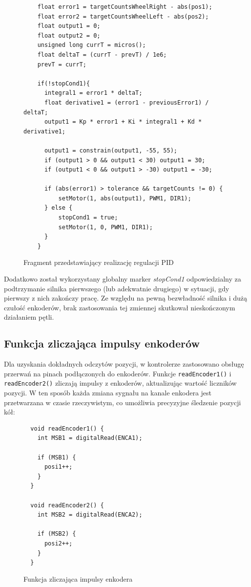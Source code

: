 \begin{figure}[H]
  \centering
  \begin{lstlisting}
    float error1 = targetCountsWheelRight - abs(pos1);
    float error2 = targetCountsWheelLeft - abs(pos2);
    float output1 = 0;
    float output2 = 0;
    unsigned long currT = micros();
    float deltaT = (currT - prevT) / 1e6;
    prevT = currT;

    if(!stopCond1){
      integral1 = error1 * deltaT;
      float derivative1 = (error1 - previousError1) / deltaT;
      output1 = Kp * error1 + Ki * integral1 + Kd * derivative1;

      output1 = constrain(output1, -55, 55);
      if (output1 > 0 && output1 < 30) output1 = 30;
      if (output1 < 0 && output1 > -30) output1 = -30;

      if (abs(error1) > tolerance && targetCounts != 0) {
          setMotor(1, abs(output1), PWM1, DIR1);
      } else {
          stopCond1 = true;
          setMotor(1, 0, PWM1, DIR1);
      }
    }
  \end{lstlisting}
  \caption{Fragment przedstawiający realizację regulacji PID}
  \label{fig:pseudokod:pid}
\end{figure}

Dodatkowo został wykorzystany globalny marker \textit{stopCond1} odpowiedzialny za podtrzymanie silnika pierwszego (lub adekwatnie drugiego) w sytuacji, gdy pierwszy z nich zakończy pracę. Ze względu na pewną bezwładność silnika i dużą czułość enkoderów, brak zastosowania tej zmiennej skutkował nieskończonym działaniem pętli. 

\subsection{Funkcja zliczająca impulsy enkoderów}

Dla uzyskania dokładnych odczytów pozycji, w kontrolerze zastosowano obsługę przerwań na pinach podłączonych do enkoderów. Funkcje \texttt{readEncoder1()} i \texttt{readEncoder2()} zliczają impulsy z enkoderów, aktualizując wartość liczników pozycji. W ten sposób każda zmiana sygnału na kanale enkodera jest przetwarzana w czasie rzeczywistym, co umożliwia precyzyjne śledzenie pozycji kół:

\begin{figure}[H]
  \centering
  \begin{lstlisting}   
  void readEncoder1() {
    int MSB1 = digitalRead(ENCA1);

    if (MSB1) {  
      posi1++;  
    }
  }

  void readEncoder2() {
    int MSB2 = digitalRead(ENCA2);

    if (MSB2) {  
      posi2++; 
    }
  }
  \end{lstlisting}
  \caption{Funkcja zliczająca impulsy enkodera}
  \label{fig:enc-count}
\end{figure}

